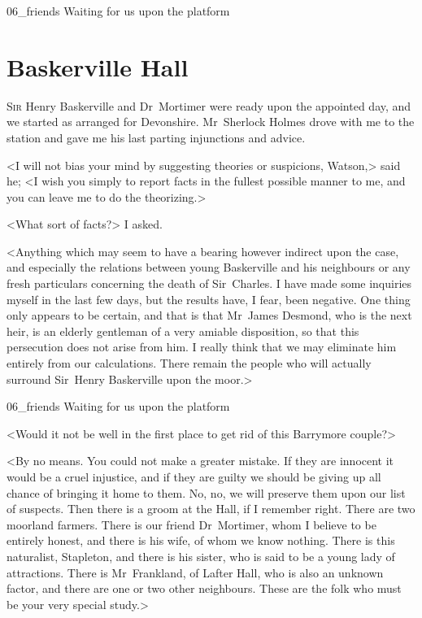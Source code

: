 
\begin{a4}
	\cleardoubleevenpage
	\begin{bwbigpic}
		[1.0] 
		{06_friends}
		{Waiting for us upon the platform}
	\end{bwbigpic}
\end{a4}

\chapter{Baskerville Hall}
\lettrine{S}{ir} Henry Baskerville and Dr~Mortimer were ready upon the appointed day, and we started as arranged for Devonshire. Mr~Sherlock Holmes drove with me to the station and gave me his last parting injunctions and advice.

<I will not bias your mind by suggesting theories or suspicions, Watson,> said he; <I wish you simply to report facts in the fullest possible manner to me, and you can leave me to do the theorizing.>

<What sort of facts?> I asked.

<Anything which may seem to have a bearing however indirect upon the case, and especially the relations between young Baskerville and his neighbours or any fresh particulars concerning the death of Sir~Charles. I have made some inquiries myself in the last few days, but the results have, I fear, been negative. One thing only appears to be certain, and that is that Mr~James Desmond, who is the next heir, is an elderly gentleman of a very amiable disposition, so that this persecution does not arise from him. I really think that we may eliminate him entirely from our calculations. There remain the people who will actually surround Sir~Henry Baskerville upon the moor.>


\begin{letter}
	\begin{bwbigpic}
			[1.0]  
		{06_friends}
		{Waiting for us upon the platform}
		\end{bwbigpic}
\end{letter}


<Would it not be well in the first place to get rid of this Barrymore couple?>

<By no means. You could not make a greater mistake. If they are innocent it would be a cruel injustice, and if they are guilty we should be giving up all chance of bringing it home to them. No, no, we will preserve them upon our list of suspects. Then there is a groom at the Hall, if I remember right. There are two moorland farmers. There is our friend Dr~Mortimer, whom I believe to be entirely honest, and there is his wife, of whom we know nothing. There is this naturalist, Stapleton, and there is his sister, who is said to be a young lady of attractions. There is Mr~Frankland, of Lafter Hall, who is also an unknown factor, and there are one or two other neighbours. These are the folk who must be your very special study.>

